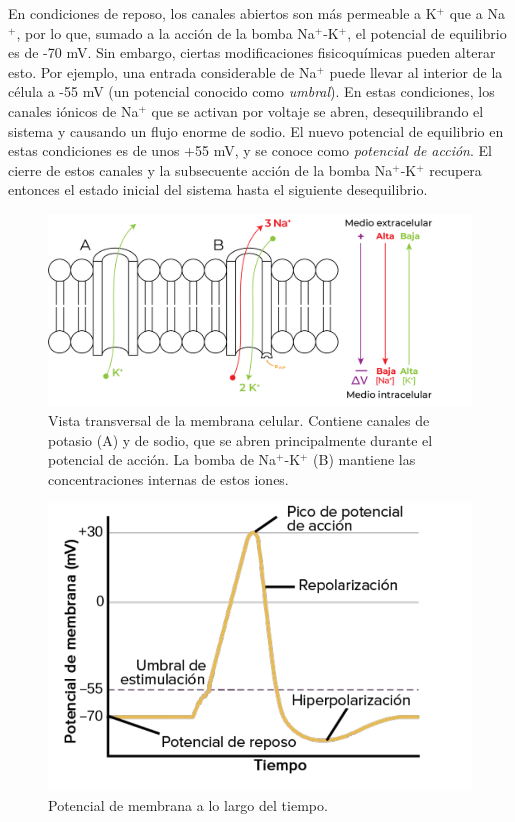 En condiciones de reposo, los canales abiertos son más permeable a K$^+$ que a Na$^+$, por lo que, sumado a la acción de la bomba Na$^+$-K$^+$, el potencial de equilibrio es de -70 mV. Sin embargo, ciertas modificaciones fisicoquímicas pueden alterar esto. Por ejemplo, una entrada considerable de Na$^+$ puede llevar al interior de la célula a -55 mV (un potencial conocido como \textit{umbral}). En estas condiciones, los canales iónicos de Na$^+$ que se activan por voltaje se abren, desequilibrando el sistema y causando un flujo enorme de sodio. El nuevo potencial de equilibrio en estas condiciones es de unos +55 mV, y se conoce como \textit{potencial de acción}. El cierre de estos canales y la subsecuente acción de la bomba Na$^+$-K$^+$ recupera entonces el estado inicial del sistema hasta el siguiente desequilibrio.

\begin{figure}[H]
	\centering

	\includegraphics[width=\linewidth]{media/6-potencial.png}
	\caption{Vista transversal de la membrana celular. Contiene canales de potasio (A) y de sodio, que se abren principalmente durante el potencial de acción. La bomba de Na$^+$-K$^+$ (B) mantiene las concentraciones internas de estos iones.}
	\label{action}
\end{figure}

\begin{figure}[H]
	\centering

	\includegraphics[width=\linewidth]{media/6-potencialgraph.png}
	\caption{Potencial de membrana a lo largo del tiempo.}
	\label{actiongraph}
\end{figure}

